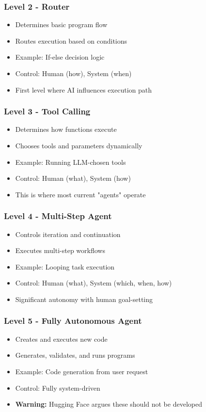 \begin{frame}[fragile]\frametitle{Level 2 - Router}
\begin{itemize}
    \item Determines basic program flow
    \item Routes execution based on conditions
    \item Example: If-else decision logic
    \item Control: Human (how), System (when)
    \item First level where AI influences execution path
\end{itemize}
\end{frame}

\begin{frame}[fragile]\frametitle{Level 3 - Tool Calling}
\begin{itemize}
    \item Determines how functions execute
    \item Chooses tools and parameters dynamically
    \item Example: Running LLM-chosen tools
    \item Control: Human (what), System (how)
    \item This is where most current "agents" operate
\end{itemize}
\end{frame}

\begin{frame}[fragile]\frametitle{Level 4 - Multi-Step Agent}
\begin{itemize}
    \item Controls iteration and continuation
    \item Executes multi-step workflows
    \item Example: Looping task execution
    \item Control: Human (what), System (which, when, how)
    \item Significant autonomy with human goal-setting
\end{itemize}
\end{frame}

\begin{frame}[fragile]\frametitle{Level 5 - Fully Autonomous Agent}
\begin{itemize}
    \item Creates and executes new code
    \item Generates, validates, and runs programs
    \item Example: Code generation from user request
    \item Control: Fully system-driven
    \item \textbf{Warning:} Hugging Face argues these should not be developed
\end{itemize}
\end{frame}

